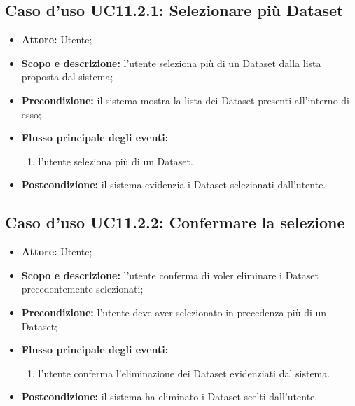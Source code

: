 \subsection{Caso d'uso UC11.2.1: Selezionare più Dataset}
\begin{itemize}
\item \textbf{Attore:} Utente;
\item \textbf{Scopo e descrizione:} l'utente seleziona più di un Dataset\glossario{} dalla lista proposta dal sistema;
\item \textbf{Precondizione:} il sistema mostra la lista dei Dataset\glossario{} presenti all'interno di esso;
\item \textbf{Flusso principale degli eventi:}
\begin{enumerate}
\item l'utente seleziona più di un Dataset\glossario{}.
\end{enumerate}
\item \textbf{Postcondizione:} il sistema evidenzia i Dataset\glossario{} selezionati dall'utente.
\end{itemize}

\subsection{Caso d'uso UC11.2.2: Confermare la selezione}
\begin{itemize}
\item \textbf{Attore:} Utente;
\item \textbf{Scopo e descrizione:} l'utente conferma di voler eliminare i Dataset\glossario{} precedentemente selezionati;
\item \textbf{Precondizione:} l'utente deve aver selezionato in precedenza più di un Dataset\glossario{};
\item \textbf{Flusso principale degli eventi:}
\begin{enumerate}
\item l'utente conferma l'eliminazione dei Dataset\glossario{} evidenziati dal sistema.
\end{enumerate}
\item \textbf{Postcondizione:} il sistema ha eliminato i Dataset\glossario{} scelti dall'utente.
\end{itemize}